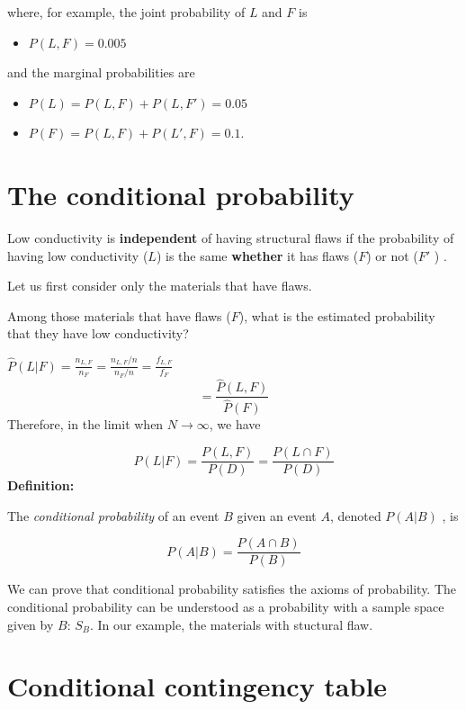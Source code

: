 \documentclass[
]{book}
\providecommand{\tightlist}{%
  \setlength{\itemsep}{0pt}\setlength{\parskip}{0pt}}
\begin{document}
where, for example, the joint probability of \(L\) and \(F\) is

\begin{itemize}
\tightlist
\item
  \(P(L,F )=0.005\)
\end{itemize}

and the marginal probabilities are

\begin{itemize}
\tightlist
\item
  \(P(L)=P(L, F) + P(L, F')=0.05\)
\item
  \(P(F)=P(L, F) + P(L', F)= 0.1\).
\end{itemize}

\hypertarget{the-conditional-probability}{%
\section{The conditional probability}\label{the-conditional-probability}}

Low conductivity is \textbf{independent} of having structural flaws if the probability of having low conductivity (\(L\)) is the same \textbf{whether} it has flaws (\(F\)) or not (\(F'\) ) .

Let us first consider only the materials that have flaws.

Among those materials that have flaws (\(F\)), what is the estimated probability that they have low conductivity?

\(\hat{P}(L| F)= \frac{n_{L,F}}{n_{F}}=\frac{n_{L,F}/n}{n_{F}/n}= \frac{f_{L,F}}{f_{F}}\)
\[= \frac{\hat{P}( L,F )}{\hat{P}(F)}\]
Therefore, in the limit when \(N \rightarrow \infty\), we have

\[P(L| F)= \frac{P(L,F)}{P(D)}=\frac{P(L\cap F)}{P(D)}\]
\textbf{Definition:}

The \emph{conditional probability} of an event \(B\) given an event \(A\), denoted \(P(A| B)\) , is

\[P(A|B) = \frac{P(A\cap B)}{P(B)}\]

We can prove that conditional probability satisfies the axioms of probability. The conditional probability can be understood as a probability with a sample space given by \(B\): \(S_B\). In our example, the materials with stuctural flaw.

\hypertarget{conditional-contingency-table}{%
\section{Conditional contingency table}\label{conditional-contingency-table}}
\end{document}
